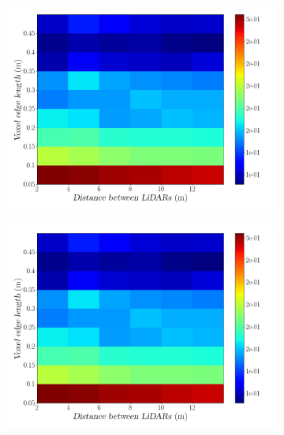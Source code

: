 \begin{figure}[!ht]
\centering
\begin{subfigure}[c]{0.45\textwidth}
	\includegraphics[width=\textwidth]{img/lidar-interference/LOS/octree_interference_color_mesh.png}
	\caption{}%
	\label{fig:los:octree-interference-color-mesh}
\end{subfigure}
\qquad
\begin{subfigure}[c]{0.45\textwidth}
	\includegraphics[width=\textwidth]{img/lidar-interference/LOS/octree_ground_truth_color_mesh.png}
\caption{}%

\end{subfigure}
\end{figure}
